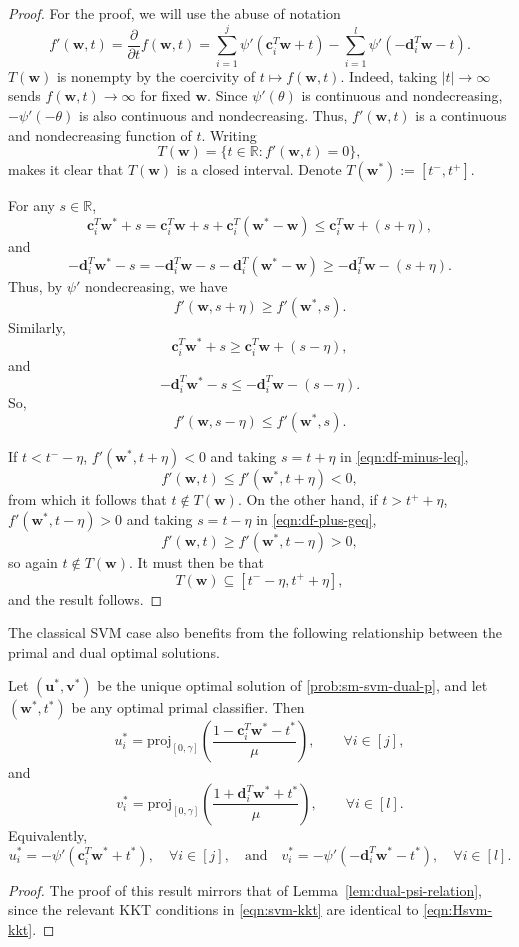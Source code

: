 \documentclass[twoside,11pt]{article}
\newcommand\proj{\mathrm{proj}}
\renewcommand{\c}{\bm{c}}
\renewcommand{\d}{\bm{d}}
\newcommand{\R}{{\mathbb{R}}} %
\renewcommand\u{\bm{u}}
\renewcommand\v{\bm{v}}
\newcommand\w{\bm{w}}
\begin{document}
\begin{proof}
    For the proof, we will use the abuse of notation
    \[
        f'(\w,t) = \frac{\partial}{\partial t} f(\w,t) = \sum_{i=1}^j \psi'(\c_i^T\w + t) - \sum_{i=1}^l \psi'(-\d_i^T\w - t).
    \]
    $T(\w)$ is nonempty by the coercivity of $t \mapsto f(\w,t)$. Indeed, taking $|t| \to \infty$ sends $f(\w,t) \to \infty$ for fixed $\w$.        
    Since $\psi'(\theta)$ is continuous and nondecreasing, $-\psi'(-\theta)$ is also continuous and nondecreasing. Thus, $f'(\w,t)$ is a continuous and nondecreasing function of $t$. Writing
    \[
        T(\w) = \{t \in \R : f'(\w,t) = 0\},
    \]
    makes it clear that $T(\w)$ is a closed interval. Denote $T(\w^*) := [t^-, t^+]$.

    For any $s \in \R$,
    \[
        \c_i^T\w^* + s = \c_i^T\w + s + \c_i^T(\w^* - \w) \leq \c_i^T\w + (s + \eta),
    \]
    and
    \[
        -\d_i^T\w^* - s = -\d_i^T\w - s - \d_i^T(\w^* - \w) \geq -\d_i^T\w - (s + \eta).
    \]
    Thus, by $\psi'$ nondecreasing, we have
    \begin{equation} \label{eqn:df-plus-geq}
        f'(\w, s+\eta) \geq f'(\w^*,s).
    \end{equation}
    Similarly,
    \[
        \c_i^T\w^* + s \geq \c_i^T\w + (s - \eta),
    \]
    and
    \[
        -\d_i^T\w^* - s \leq -\d_i^T\w - (s - \eta).
    \]
    So,
    \begin{equation} \label{eqn:df-minus-leq}
        f'(\w, s - \eta) \leq f'(\w^*,s).
    \end{equation}

    If $t < t^- - \eta$, $f'(\w^*,t+\eta) < 0$ and taking $s = t + \eta$ in \eqref{eqn:df-minus-leq},
    \[
        f'(\w,t) \leq f'(\w^*,t+\eta) < 0,
    \]
    from which it follows that $t \notin T(\w)$.
    On the other hand, if $t > t^+ + \eta$, $f'(\w^*,t-\eta) > 0$ and taking $s = t - \eta$ in \eqref{eqn:df-plus-geq},
    \[
        f'(\w,t) \geq f'(\w^*,t-\eta) > 0,
    \]
    so again $t \notin T(\w)$. It must then be that
    \[
        T(\w) \subseteq [t^- - \eta, t^+ + \eta],
    \]
    and the result follows.
\end{proof}

The classical SVM case also benefits from the following relationship between the primal and dual optimal solutions.
\begin{theorem} \label{thm:Csvm-dual-psi-relation}
Let $(\u^*,\v^*)$ be the unique optimal solution of \eqref{prob:sm-svm-dual-p}, and let $(\w^*,t^*)$ be any optimal primal classifier. Then
\[
    u_i^* = \proj_{[0,\gamma]}\left(\frac{1-\c_i^T\w^* - t^*}{\mu}\right),\qquad \forall i\in[j],
\]
and
\[
    v_i^* = \proj_{[0,\gamma]}\left(\frac{1+\d_i^T\w^* + t^*}{\mu}\right),\qquad \forall i\in[l].
\]
Equivalently,
\[
    u_i^* = -\psi'(\c_i^T\w^* + t^*),\quad\forall i \in [j],\quad\text{and}\quad v_i^* = -\psi'(-\d_i^T\w^* - t^*),\quad\forall i \in [l].
\]
\end{theorem}
\begin{proof}
The proof of this result mirrors that of Lemma~\ref{lem:dual-psi-relation}, since the relevant KKT conditions in \eqref{eqn:svm-kkt} are identical to \eqref{eqn:Hsvm-kkt}.
\end{proof}
\end{document}
